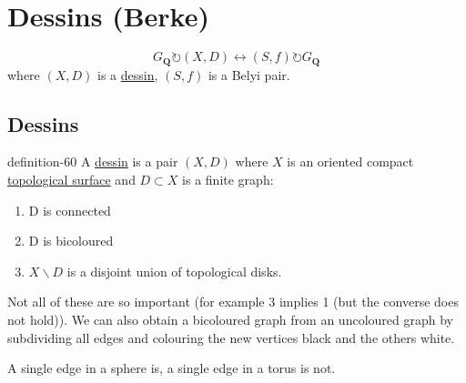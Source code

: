 \documentclass[10pt,]{book}
\numberwithin{equation}{section}
\newcommand{\QQ}{\mathbf{Q}}
\newcommand{\acts}{\circlearrowright}
\begin{document}
\section[{Dessins (Berke)}]{Dessins (Berke)}\label{sec-dessins}
\hypertarget{p-636}{}%
%
\begin{equation*}
G_\QQ \acts (X,D) \leftrightarrow (S,f) \acts G_\QQ
\end{equation*}
where \((X,D)\) is a \hyperref[def-dessin-denfant]{dessin}, \((S,f)\) is a Belyi pair.%
%
%
\typeout{************************************************}
\typeout{************************************************}
%
\subsection[{Dessins}]{Dessins}\label{subsection-59}
\begin{definition}{}{definition-60}%
\hypertarget{p-637}{}%
A \hyperref[def-dessin-denfant]{dessin} is  a pair \((X,D)\) where \(X\) is an oriented compact \hyperref[def-top-riem-surface]{topological surface} and \(D\subset X\) is a finite graph:\leavevmode%
\begin{enumerate}
\item\hypertarget{li-142}{}D is connected%
\item\hypertarget{li-143}{}D is bicoloured%
\item\hypertarget{li-144}{}\(X \smallsetminus D\) is a disjoint union of topological disks.%
\end{enumerate}
%
\end{definition}
\hypertarget{p-638}{}%
Not all of these are so important (for example 3 implies 1 (but the converse does not hold)). We can also obtain a bicoloured graph from an uncoloured graph by subdividing all edges and colouring the new vertices black and the others white.%
\par
\hypertarget{p-639}{}%
A single edge in a sphere is, a single edge in a torus is not.%
%
%
\typeout{************************************************}
\typeout{************************************************}
%
\end{document}
